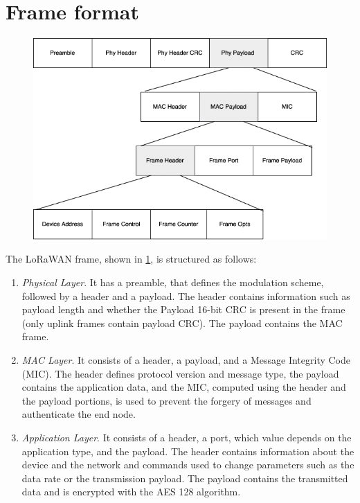 \section{Frame format}
\begin{figure}[H]
    \centering
    \includegraphics[width=0.7\linewidth]{images/lorawan/frame_format.png}
    \caption{}
    \label{fig:frame}
\end{figure}
The LoRaWAN frame, shown in \ref{fig:frame}, is structured as follows:
\begin{enumerate}
	\item \textit{Physical Layer}.  It has a preamble, that defines the modulation scheme, followed by a header and a payload. The header contains information such as payload length and whether the Payload 16-bit CRC is present in the frame (only uplink frames contain payload CRC). The payload contains the MAC frame.
	\item \textit{MAC Layer}. It consists of a header, a payload, and a Message Integrity Code (MIC). The header defines protocol version and message type, the payload contains the application data, and the MIC, computed using the header and the payload portions, is used to prevent the forgery of messages and authenticate the end node.
	\item \textit{Application Layer}. It consists of a header, a port, which value depends on the application type, and the payload. The header contains information about the device and the network and commands used to change parameters such as the data rate or the transmission payload. The payload contains the transmitted data and is encrypted with the AES 128 algorithm. 
\end{enumerate}


